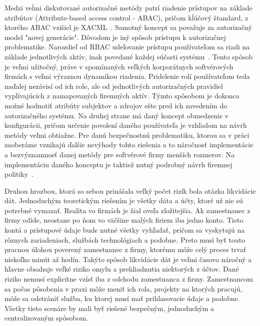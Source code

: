 \par Medzi veĺmi diskutované autorizačné metódy patrí riadenie prístupov na základe atribútov (Attribute-based access
control - ABAC), pričom kĺúčový štandard, z ktorého ABAC vzišiel je XACML~\cite{XACML}. Samotný koncept
sa považuje za autorizačný model "novej generácie". Dôvodom je iný spôsob prístupu k
autorizačnej problematike. Narozdieľ od RBAC udeľovanie prístupu používateľom sa riadi na základe jednotlivých aktív,
inak povedané každej súčasti systému~\cite{ABAC_RBAC_Attributes}. Tento spôsob je veľmi užitočný, práve v spomínaných veľkých korporátnych softvérových
firmách s veľmi výraznou dynamikou riadenia. Pridelenie rolí používateľom teda naďalej nezávisí od ich role, ale od
jednotlivých autorizačných pravidiel vyplívajúcich z namapovaných firemných aktív. Týmto spôsobom je dokonca možné hodnotiť
atribúty subjektov a zdrojov ešte pred ich zavedením do autorizačného systému. Na druhej strane má daný koncept obmedzenie
v konfigurácii, pričom určenie povolení daného používateľa je vzhľadom na návrh metódy veľmi obtiažne. Pre danú bezpečnostnú
problematiku, ktorou sa v práci zaoberáme vznikajú ďalšie nevýhody tohto riešenia a to náročnosť implementácie a bezvýznamnosť danej metódy pre
softvérové firmy menších rozmerov. Na implementáciu daného konceptu je taktiež nutný podrobný návrh firemnej politiky~\cite{RBAC_ABAC_Encryption}.

\par Druhou hrozbou, ktorá so sebou prinášala veľký počet rizík bola otázka likvidácie dát. Jednoduchým teoretickým
riešením je všetky dáta a účty, ktoré už nie sú potrebné vymazať. Realita vo firmách je žial oveľa zložitejšia. Ak zamestnanec
z firmy odíde, neostane po ňom vo väčšine malých firiem iba jedno konto. Tieto kontá a prístupové údaje bude nutné všetky vyhľadať,
pričom sa vyskytujú na rôznych zariadeniach, službách technológiach a podobne. Preto musí byť touto pracnou úlohou poverený
zamestnanec z firmy, ktorému môže celý proces trvať niekoľko minút až hodín. Takýto spôsob likvidácie dát je veľmi časovo náročný
a hľavne obsahuje veľké riziko omylu a prehliadnutia niektorých z účtov. Dané riziko nemusí explicitne vzísť iba z odchodu
zamestnanca z firmy. Zamestnancom sa počas pôsobenia v praxi môže meniť ich rola, projekty na ktorých pracujú, môže sa odstrániť
služba, ku ktorej musí mať prihlasovacie údaje a podobne. Všetky tieto scenáre by mali byť riešené bezpečným, jednoduchým a
centralizovaným spôsobom.

